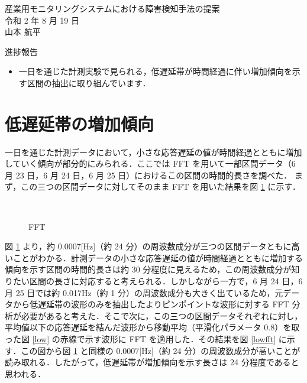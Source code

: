 \documentclass[a4j]{jarticle}
\begin{document}
\begin{table}[t]
\begin{center}
{\large 産業用モニタリングシステムにおける障害検知手法の提案}\\
令和 2 年 8 月 19 日\\
山本 航平
\end{center}
\end{table}

進捗報告
\begin{itemize}
\item 一日を通じた計測実験で見られる，低遅延帯が時間経過に伴い増加傾向を示す区間の抽出に取り組んでいます．
\end{itemize}

\section{低遅延帯の増加傾向}
一日を通じた計測データにおいて，小さな応答遅延の値が時間経過とともに増加していく傾向が部分的にみられる．ここでは FFT を用いて一部区間データ（6 月 23 日，6 月 24 日，6 月 25 日）におけるこの区間の時間的長さを調べた．
まず，この三つの区間データに対してそのまま FFT を用いた結果を図 \ref{fft} に示す．
\begin{figure}[tb]
\begin{center}
~
~
\caption{FFT}
\label{fft}
\end{center}
\end{figure}
図 \ref{fft} より，約 0.0007[Hz]（約 24 分）の周波数成分が三つの区間データともに高いことがわかる．計測データの小さな応答遅延の値が時間経過とともに増加する傾向を示す区間の時間的長さは約 30 分程度に見えるため，この周波数成分が知りたい区間の長さに対応すると考えられる．しかしながら一方で，6 月 24 日，6 月 25 日では約 0.017Hz（約 1 分）の周波数成分も大きく出ているため，元データから低遅延帯の波形のみを抽出したよりピンポイントな波形に対する FFT 分析が必要があると考えた．そこで次に，この三つの区間データそれぞれに対し，平均値以下の応答遅延を結んだ波形から移動平均（平滑化パラメータ 0.8）を取った図 \ref{low} の赤線で示す波形に FFT を適用した．その結果を図 \ref{lowfft} に示す．この図から図 \ref{fft} と同様の 0.0007[Hz]（約 24 分）の周波数成分が高いことが読み取れる．したがって，低遅延帯が増加傾向を示す長さは 24 分程度であると思われる．
\end{document}

